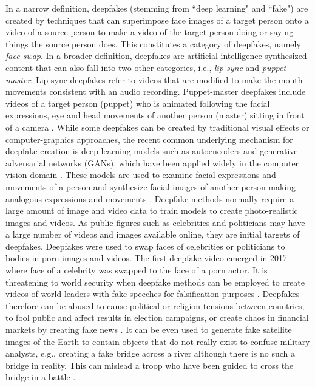 

\label{sec1}
In a narrow definition, deepfakes (stemming from ``deep learning" and ``fake") are created by techniques that can superimpose face images of a target person onto a video of a source person to make a video of the target person doing or saying things the source person does. This constitutes a category of deepfakes, namely \emph{face-swap}. In a broader definition, deepfakes are artificial intelligence-synthesized content that can also fall into two other categories, i.e., \emph{lip-sync} and \emph{puppet-master}. Lip-sync deepfakes refer to videos that are modified to make the mouth movements consistent with an audio recording. Puppet-master deepfakes include videos of a target person (puppet) who is animated following the facial expressions, eye and head movements of another person (master) sitting in front of a camera .
While some deepfakes can be created by traditional visual effects or computer-graphics approaches, the recent common underlying mechanism for deepfake creation is deep learning models such as autoencoders and generative adversarial networks (GANs), which have been applied widely in the computer vision domain . These models are used to examine facial expressions and movements of a person and synthesize facial images of another person making analogous expressions and movements . Deepfake methods normally require a large amount of image and video data to train models to create photo-realistic images and videos. As public figures such as celebrities and politicians may have a large number of videos and images available online, they are initial targets of deepfakes. Deepfakes were used to swap faces of celebrities or politicians to bodies in porn images and videos. The first deepfake video emerged in 2017 where face of a celebrity was swapped to the face of a porn actor. It is threatening to world security when deepfake methods can be employed to create videos of world leaders with fake speeches for falsification purposes . Deepfakes therefore can be abused to cause political or religion tensions between countries, to fool public and affect results in election campaigns, or create chaos in financial markets by creating fake news . It can be even used to generate fake satellite images of the Earth to contain objects that do not really exist to confuse military analysts, e.g., creating a fake bridge across a river although there is no such a bridge in reality. This can mislead a troop who have been guided to cross the bridge in a battle .

